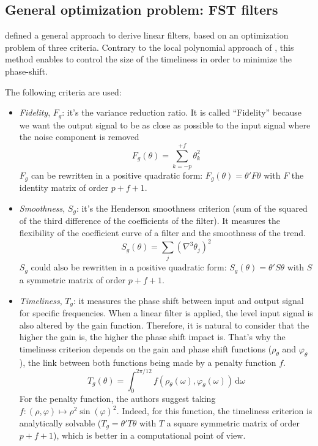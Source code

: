\documentclass[fleqn,10pt]{latex/stylish_article} %
\newcommand\1{\mathds{1}}
\newcommand\ud{\,\mathrm{d}}
\begin{document}
\hypertarget{sec:GuggemosEtAl}{%
\subsection{General optimization problem: FST filters}\label{sec:GuggemosEtAl}}

\citet{ch15HBSA} defined a general approach to derive linear filters, based on an optimization problem of three criteria.
Contrary to the local polynomial approach of \citet{proietti2008}, this method enables to control the size of the timeliness in order to minimize the phase-shift.

The following criteria are used:

\begin{itemize}
\item
  \emph{Fidelity}, \(F_g\): it's the variance reduction ratio. It is called ``Fidelity'' because we want the output signal to be as close as possible to the input signal where the noise component is removed
  \[
  F_g(\theta) = \sum_{k=-p}^{+f}\theta_{k}^{2}
  \]
  \(F_g\) can be rewritten in a positive quadratic form: \(F_g(\theta)=\theta'F\theta\) with \(F\) the identity matrix of order \(p+f+1\).
\item
  \emph{Smoothness}, \(S_g\): it's the Henderson smoothness criterion (sum of the squared of the third difference of the coefficients of the filter).
  It measures the flexibility of the coefficient curve of a filter and the smoothness of the trend.
  \[
  S_g(\theta) = \sum_{j}(\nabla^{3}\theta_{j})^{2}
  \]
  \(S_g\) could also be rewritten in a positive quadratic form: \(S_g(\theta)=\theta'S\theta\) with \(S\) a symmetric matrix of order \(p+f+1\).
\item
  \emph{Timeliness}, \(T_g\): it measures the phase shift between input and output signal for specific frequencies.
  When a linear filter is applied, the level input signal is also altered by the gain function.
  Therefore, it is natural to consider that the higher the gain is, the higher the phase shift impact is.
  That's why the timeliness criterion depends on the gain and phase shift functions (\(\rho_\theta\) and \(\varphi_{\theta}\)), the link between both functions being made by a penalty function \(f\).
  \[
  T_g(\theta)=\int_{0}^{2\pi/12}f(\rho_{\theta}(\omega),\varphi_{\theta}(\omega))\ud\omega
  \]
  For the penalty function, the authors suggest taking \(f\colon(\rho,\varphi)\mapsto\rho^2\sin(\varphi)^2\).
  Indeed, for this function, the timeliness criterion is analytically solvable (\(T_g=\theta'T\theta\) with \(T\) a square symmetric matrix of order \(p+f+1\)), which is better in a computational point of view.
\end{itemize}
\end{document}
